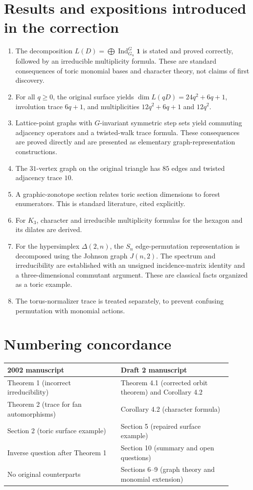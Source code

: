 \documentclass[12pt,letterpaper]{article}
\begin{document}
\section{Results and expositions introduced in the correction}
\begin{enumerate}
\item The decomposition $L(D)=\bigoplus\operatorname{Ind}_{G_u}^{G}\mathbf1$ is stated and proved correctly, followed by an irreducible multiplicity formula. These are standard consequences of toric monomial bases and character theory, not claims of first discovery.
\item For all $q\geq0$, the original surface yields $\dim L(qD)=24q^2+6q+1$, involution trace $6q+1$, and multiplicities $12q^2+6q+1$ and $12q^2$.
\item Lattice-point graphs with $G$-invariant symmetric step sets yield commuting adjacency operators and a twisted-walk trace formula. These consequences are proved directly and are presented as elementary graph-representation constructions.
\item The $31$-vertex graph on the original triangle has $85$ edges and twisted adjacency trace $10$.
\item A graphic-zonotope section relates toric section dimensions to forest enumerators. This is standard literature, cited explicitly.
\item For $K_3$, character and irreducible multiplicity formulas for the hexagon and its dilates are derived.
\item For the hypersimplex $\Delta(2,n)$, the $S_n$ edge-permutation representation is decomposed using the Johnson graph $J(n,2)$. The spectrum and irreducibility are established with an unsigned incidence-matrix identity and a three-dimensional commutant argument. These are classical facts organized as a toric example.
\item The torus-normalizer trace is treated separately, to prevent confusing permutation with monomial actions.
\end{enumerate}

\section{Numbering concordance}
\begin{center}
\begin{tabular}{@{}p{0.46\linewidth}p{0.45\linewidth}@{}}
\toprule
2002 manuscript & Draft 2 manuscript\\\midrule
Theorem 1 (incorrect irreducibility) & Theorem 4.1 (corrected orbit theorem) and Corollary 4.2\\
Theorem 2 (trace for fan automorphisms) & Corollary 4.2 (character formula)\\
Section 2 (toric surface example) & Section 5 (repaired surface example)\\
Inverse question after Theorem 1 & Section 10 (summary and open questions)\\
No original counterparts & Sections 6--9 (graph theory and monomial extension)\\
\bottomrule
\end{tabular}
\end{center}
\end{document}
